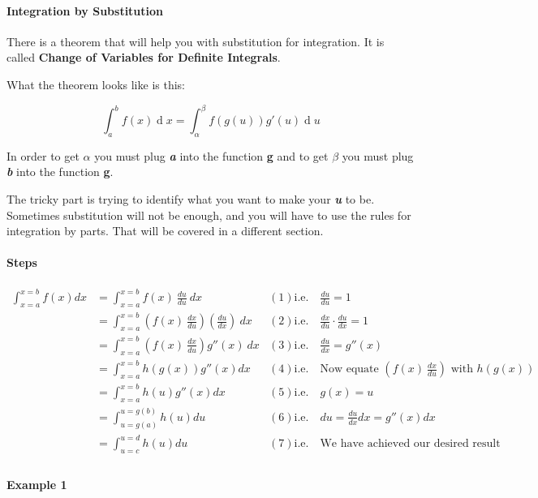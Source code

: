 \paragraph{Integration by Substitution}

There is a theorem that will help you with substitution for integration. It is called \textbf{Change of Variables for Definite Integrals}.

What the theorem looks like is this:

$$\int_{a}^{b} f(x)\operatorname{d}x = \int_{\alpha}^{\beta} f(g(u))g'(u)\operatorname{d}u$$

In order to get $\alpha$ you must plug \textbf{\textit{a}} into the function \textbf{g} and to get $\beta$ you must plug \textbf{\textit{b}} into the function \textbf{g}.

The tricky part is trying to identify what you want to make your \textbf{\textit{u}} to be. Sometimes substitution will not be enough, and you will have to use the rules for integration by parts. That will be covered in a different section.

\paragraph{Steps}
\begin{align}
\int_{x=a}^{x=b}f(x)dx &= \int_{x=a}^{x=b} f(x)\ \frac{du}{du}\ dx & (1) \text{i.e.} \quad \frac{du}{du}=1 \\
&= \int_{x=a}^{x=b}{\left(f(x)\ \frac{dx}{du}\right)\left(\frac{du}{dx}\right)}\ dx & (2) \text{i.e.} \quad \frac{dx}{du}\cdot\frac{du}{dx}=1 \\
&= \int_{x=a}^{x=b}\left(f(x)\ \frac{dx}{du}\right)g''(x)\ dx & (3) \text{i.e.} \quad \frac{du}{dx}=g''(x) \\
&= \int_{x=a}^{x=b}h(g(x))g''(x)dx & (4) \text{i.e.} \quad \text{Now equate } \left(f(x)\ \frac{dx}{du}\right) \text{ with } h(g(x)) \\
&= \int_{x=a}^{x=b}h(u)g''(x)dx & (5) \text{i.e.} \quad g(x)=u \\
&= \int_{u=g(a)}^{u=g(b)}h(u)du & (6) \text{i.e.} \quad du=\frac{du}{dx}dx=g''(x)dx \\
&= \int_{u=c}^{u=d}h(u)du & (7) \text{i.e.} \quad \text{We have achieved our desired result} \\
\end{align}

\paragraph{Example 1}

